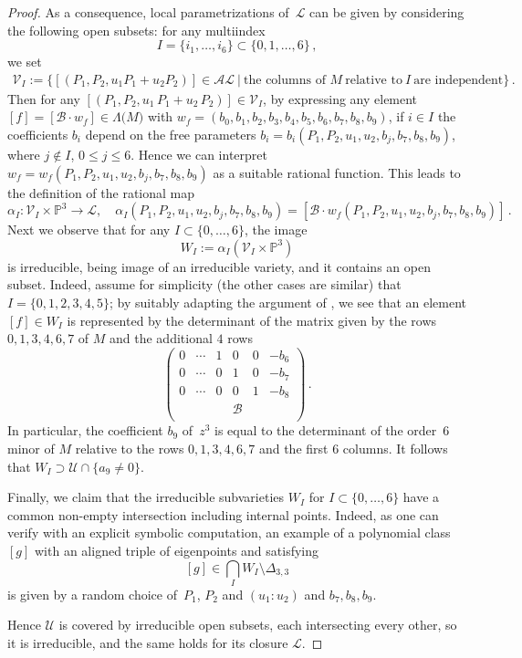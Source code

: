 \documentclass[a4paper, 11pt, reqno]{amsart}
\theoremstyle{plain}
\theoremstyle{definition}
\newcommand{\p}{\mathbb{P}}
\newcommand{\sL}{\mathcal{L}}
\newcommand{\sU}{\mathcal{U}}
\newcommand{\sV}{\mathcal{V}}
\begin{document}
\begin{proof}
As a consequence, local parametrizations of~$\sL$ can be given by considering the following open subsets:
for any multiindex
%
\[
  I = \{i_1, \dots, i_6\} \subset \{0, 1, \dots, 6\} \,,
\]
%
we set
%
\begin{multline*}
  \sV_I :=
  \bigl\{
    [(P_1, P_2, u_1 P_1 +u_2P_2)] \in \mathcal{AL} \ | \ \text{the\ columns\ of\ } M \ 
    \text{relative \ to} \ I\ \text{are\ independent}
  \bigr\} \,.
\end{multline*}
%
Then for any $[(P_1, P_2, u_1 \, P_1 + u_2 \, P_2)] \in \sV_I$, by expressing any element
$[f] =[\mathcal{B} \cdot w_f]\in \Lambda \bigl( M \bigr)$ with
$ w_f = (b_0,
  b_1,
  b_2,
  b_3,
  b_4,
  b_5, b_6,b_7,b_8,b_9)$,
%
if $i\in I$ the coefficients $b_i$ depend on the free parameters $b_i=b_i(P_1,P_2,u_1,u_2,b_j,b_7,b_8,b_9)$, where $j \not \in I$, $0\le j \le 6$. Hence we can interpret $w_f=w_f(P_1,P_2,u_1,u_2,b_j,b_7,b_8,b_9)$ as a suitable rational function.
This leads to the definition of the rational map
%
\[
  \alpha_I \colon \sV_I \times \p^3 \to \sL, \quad
  \alpha_I (P_1,P_2,u_1,u_2,b_j,b_7,b_8,b_9)=
  [\mathcal{B} \cdot w_f(P_1,P_2,u_1,u_2,b_j,b_7,b_8,b_9)] \,.
\]
%
Next we observe that for any $I \subset \{0,\dots, 6\}$, the image
%
\[
  W_I := \alpha_I (\sV_I \times \p^3)
\]
%
is irreducible, being image of an irreducible variety, and it
contains an open subset. Indeed, assume for simplicity (the other cases are similar) that
$I=\{0,1,2,3,4,5\}$; by suitably adapting the argument of \Cref{lemma:construct_cubic}, we see that an element $[f]\in W_I$ is represented by the determinant of the
matrix given by the rows
$0,1,3,4,6,7$ of $M$ and the additional $4$ rows
%
\[
  \left(
  \begin{array}{cccccc}
    0 & \cdots & 1&0&0&-b_6 \\
    0 & \cdots & 0&1&0&-b_7 \\
    0 & \cdots & 0&0&1&-b_8 \\
    & & & \mathcal{B} & & \\
  \end{array}
  \right) \,.
\]
%
In particular, the coefficient $b_9$ of~$z^3$ is equal to the determinant of the order~$6$ minor of $M$ relative to the rows $0,1,3,4,6,7$ and the first $6$ columns. It follows that $W_I \supset \sU \cap \{ a_9 \neq 0\}$. 

Finally, we claim that the irreducible subvarieties $W_I$ for $I\subset \{0,\dots, 6\}$ have a common non-empty intersection
including internal points. Indeed, as one can verify with an explicit symbolic computation, an example of a polynomial
class~$[g]$ with an aligned triple of eigenpoints and satisfying
%
\[
  [g] \in \bigcap_I W_I \setminus \Delta_{3,3}
\]
%
is given by a random choice of~$P_1$, $P_2$ and $(u_1:u_2)$ and $b_7,b_8,b_9$.

Hence $\sU$ is covered by irreducible open subsets, each intersecting every other, so it is irreducible, and the same holds for its closure $\sL$.
\end{proof}
\end{document}
